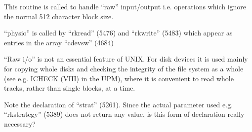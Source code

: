 
This routine is called to handle ``raw''
input/output i.e. operations which
ignore the normal 512 character block
size.

``physio'' is called by ``rkread'' (5476)
and ``rkwrite'' (5483) which appear as
entries in the array ``cdevsw'' (4684)

``Raw i/o'' is not an essential feature
of UNIX. For disk devices it is used
mainly for copying whole disks and
checking the integrity of the file system as a whole (see e.g. ICHECK (VIII)
in the UPM), where it is convenient to
read whole tracks, rather than single
blocks, at a time.

Note the declaration of ``strat'' (5261).
Since the actual parameter used e.g.
``rkstrategy'' (5389) does not return any
value, is this form of declaration
really necessary?
